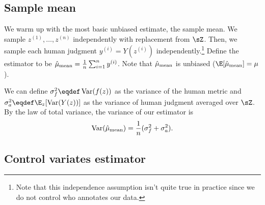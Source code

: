 

\subsection{Sample mean}

We warm up with the most basic unbiased estimate, the sample mean.
We sample $z^{(1)}, \dots, z^{(n)}$ independently with replacement from $\sZ$.
Then, we sample each human judgment $y^{(i)} = Y(z^{(i)})$ independently.\footnote{%
Note that this independence assumption isn't quite true in practice since we do not control who annotates our data.}
Define the estimator to be $\hat \mu_\text{mean} = \frac{1}{n} \sum_{i=1}^n y^{(i)}$.
Note that $\hat \mu_\text{mean}$ is unbiased ($\E[\musimple] = \mu$).

We can define $\sigma^2_f \eqdef \Var(f(z))$ as the variance of the human metric
and $\sigma^2_a \eqdef \E_z[\Var(Y(z))]$ as the variance of human judgment averaged over $\sZ$.
By the law of total variance, the variance of our estimator
is
\begin{align}
\label{eqn:varsimple}
\operatorname{Var}(\hat \mu_\text{mean}) = \frac{1}{n} (\sigma^2_f + \sigma^2_a).
\end{align}


\subsection{Control variates estimator}

